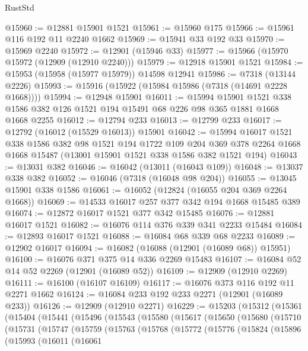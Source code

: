 \begin{lexlean}{RustStd}
\begin{coremodule}
@15960 := @12881 @15901 @1521
@15961 := @15960 @175
@15966 := @15961 @116 @192 @11 @2240 @1662
@15969 := @15941 @33 @192 @33
@15970 := @15969 @2240
@15972 := @12901 (@15946 @33)
@15977 := @15966 (@15970 @15972 (@12909 (@12910 @2240)))
@15979 := @12918 @15901 @1521
@15984 := @15953 (@15958 (@15977 @15979)) @14598 @12941
@15986 := @7318 (@13144 @2226)
@15993 := @15916 (@15922 (@15984 @15986 (@7318 (@14691 @2228 @1668))))
@15994 := @12948 @15901
@16011 := @15994
    @15901
    @1521
    @338
    @1586
    @382
    @126
    @1521
    @194
    @15491
    @68
    @226
    @98
    @365
    @1881
    @1668
    @1668
    @2255
@16012 := @12794 @233
@16013 := @12799 @233
@16017 := @12792 (@16012 (@15529 @16013)) @15901
@16042 := @15994
    @16017
    @1521
    @338
    @1586
    @382
    @98
    @1521
    @194
    @1722
    @109
    @204
    @369
    @378
    @2264
    @1668
    @1668
    @15487
    (@13001 @15901 @1521 @338 @1586 @382 @1521 @194)
@16043 := @13031 @382
@16046 := @16042 (@13011 (@16043 @109))
@16048 := @13037 @338 @382
@16052 := @16046 (@7318 (@16048 @98 @204))
@16055 := @13045 @15901 @338 @1586
@16061 := @16052 (@12824 (@16055 @204 @369 @2264 @1668))
@16069 := @14533 @16017 @257 @377 @342 @194 @1668 @15485 @389
@16074 := @12872 @16017 @1521 @377 @342 @15485
@16076 := @12881 @16017 @1521
@16082 := @16076 @114 @376 @339 @341 @2233 @15484
@16084 := @12893 @16017 @1521
@16088 := @16084 @68 @339 @68 @2233
@16089 := @12902 @16017
@16094 := @16082 (@16088 (@12901 (@16089 @68)) @15951)
@16100 := @16076 @371 @375 @14 @336 @2269 @15483
@16107 := @16084 @52 @14 @52 @2269 (@12901 (@16089 @52))
@16109 := @12909 (@12910 @2269)
@16111 := @16100 (@16107 @16109)
@16117 := @16076 @373 @116 @192 @11 @2271 @1662
@16124 := @16084 @233 @192 @233 @2271 (@12901 (@16089 @233))
@16126 := @12909 (@12910 @2271)
@16229 := @15203
    (@15312
      (@15361
        (@15404
          (@15441
            (@15496
              (@15543
                (@15580
                  (@15617
                    (@15650
                      (@15680
                        (@15710
                          (@15731
                            (@15747
                              (@15759
                                (@15763
                                  (@15768
                                    (@15772
                                      (@15776
                                        (@15824
                                          (@15896
                                            (@15993
                                              (@16011
                                                (@16061

\end{coremodule}
\end{lexlean}
